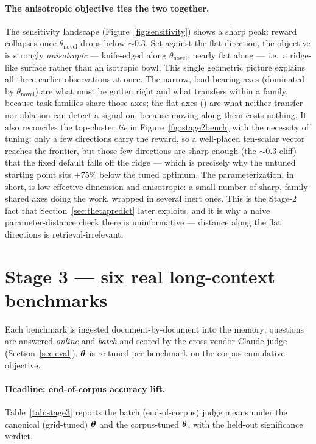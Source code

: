 \paragraph{The anisotropic objective ties the two together.} The sensitivity
landscape (Figure~\ref{fig:sensitivity}) shows a sharp peak: reward collapses
once $\theta_{\mathrm{novel}}$ drops below $\sim$$0.3$. Set against the flat
\wgraph{} direction, the objective is strongly \emph{anisotropic} --- knife-edged
along $\theta_{\mathrm{novel}}$, nearly flat along \wgraph{} --- i.e.\ a
ridge-like surface rather than an isotropic bowl. This single geometric picture
explains all three earlier observations at once. The narrow, load-bearing axes
(dominated by $\theta_{\mathrm{novel}}$) are what must be gotten right and what
transfers within a family, because task families share those axes; the flat axes
(\wgraph{}) are what neither transfer nor ablation can detect a signal on,
because moving along them costs nothing. It also reconciles the top-cluster
\emph{tie} in Figure~\ref{fig:stage2bench} with the necessity of tuning: only a
few directions carry the reward, so a well-placed ten-scalar vector reaches the
frontier, but those few directions are sharp enough (the $\sim$$0.3$ cliff) that
the fixed default falls off the ridge --- which is precisely why the untuned
starting point sits $+75\%$ below the tuned optimum. The parameterization, in
short, is low-effective-dimension and anisotropic: a small number of sharp,
family-shared axes doing the work, wrapped in several inert ones. This is the
Stage-2 fact that Section~\ref{sec:thetapredict} later exploits, and it is why a
naive parameter-distance check there is uninformative --- distance along the flat
directions is retrieval-irrelevant.

\section{Stage 3 --- six real long-context benchmarks}
\label{sec:stage3}
Each benchmark is ingested document-by-document into the \Vt{} memory; questions
are answered \emph{online} and \emph{batch} and scored by the cross-vendor
Claude judge (Section~\ref{sec:eval}). $\boldsymbol{\theta}$ is re-tuned per benchmark on
the corpus-cumulative \recallk{} objective.

\paragraph{Headline: end-of-corpus accuracy lift.}
Table~\ref{tab:stage3} reports the batch (end-of-corpus) judge means under the
canonical (grid-tuned) $\boldsymbol{\theta}$ and the corpus-tuned $\boldsymbol{\theta}$, with the
held-out significance verdict.


